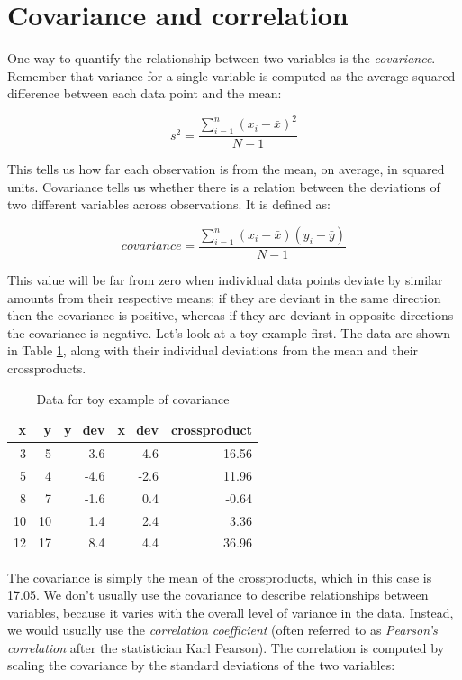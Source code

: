 \documentclass[
  12pt,
]{book}
\begin{document}
\hypertarget{covariance-and-correlation}{%
\section{Covariance and correlation}\label{covariance-and-correlation}}

One way to quantify the relationship between two variables is the \emph{covariance}. Remember that variance for a single variable is computed as the average squared difference between each data point and the mean:

\[
s^2 = \frac{\sum_{i=1}^n (x_i - \bar{x})^2}{N - 1}
\]

This tells us how far each observation is from the mean, on average, in squared units. Covariance tells us whether there is a relation between the deviations of two different variables across observations. It is defined as:

\[
covariance = \frac{\sum_{i=1}^n (x_i - \bar{x})(y_i - \bar{y})}{N - 1}
\]

This value will be far from zero when individual data points deviate by similar amounts from their respective means; if they are deviant in the same direction then the covariance is positive, whereas if they are deviant in opposite directions the covariance is negative. Let's look at a toy example first. The data are shown in Table \ref{tab:covTable}, along with their individual deviations from the mean and their crossproducts.

\begin{table}

\caption{\label{tab:covTable}Data for toy example of covariance}
\centering
\begin{tabular}[t]{r|r|r|r|r}
\hline
x & y & y\_dev & x\_dev & crossproduct\\
\hline
3 & 5 & -3.6 & -4.6 & 16.56\\
\hline
5 & 4 & -4.6 & -2.6 & 11.96\\
\hline
8 & 7 & -1.6 & 0.4 & -0.64\\
\hline
10 & 10 & 1.4 & 2.4 & 3.36\\
\hline
12 & 17 & 8.4 & 4.4 & 36.96\\
\hline
\end{tabular}
\end{table}

The covariance is simply the mean of the crossproducts, which in this case is 17.05. We don't usually use the covariance to describe relationships between variables, because it varies with the overall level of variance in the data. Instead, we would usually use the \emph{correlation coefficient} (often referred to as \emph{Pearson's correlation} after the statistician Karl Pearson). The correlation is computed by scaling the covariance by the standard deviations of the two variables:
\end{document}
